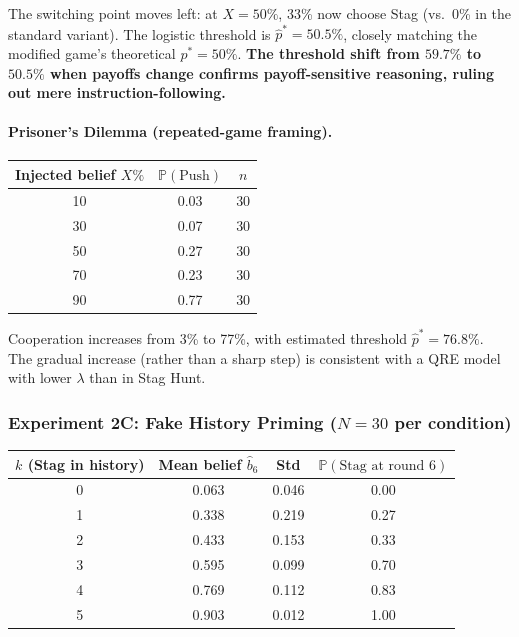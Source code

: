 \documentclass[12pt]{article}
\newcommand{\Prob}{\mathbb{P}}
\begin{document}
The switching point moves left: at $X=50\%$, 33\% now choose Stag (vs.\ 0\% in the standard variant). The logistic threshold is $\hat{p}^* = 50.5\%$, closely matching the modified game's theoretical $p^* = 50\%$. \textbf{The threshold shift from $59.7\%$ to $50.5\%$ when payoffs change confirms payoff-sensitive reasoning, ruling out mere instruction-following.}

\paragraph{Prisoner's Dilemma (repeated-game framing).}

\begin{center}
\begin{tabular}{@{}ccc@{}}
\toprule
Injected belief $X\%$ & $\Prob(\text{Push})$ & $n$ \\
\midrule
10 & 0.03 & 30 \\
30 & 0.07 & 30 \\
50 & 0.27 & 30 \\
70 & 0.23 & 30 \\
90 & 0.77 & 30 \\
\bottomrule
\end{tabular}
\end{center}

Cooperation increases from 3\% to 77\%, with estimated threshold $\hat{p}^* = 76.8\%$. The gradual increase (rather than a sharp step) is consistent with a QRE model with lower $\lambda$ than in Stag Hunt.


\subsubsection{Experiment 2C: Fake History Priming ($N=30$ per condition)}

\begin{center}
\begin{tabular}{@{}cccc@{}}
\toprule
$k$ (Stag in history) & Mean belief $\hat{b}_6$ & Std & $\Prob(\text{Stag at round 6})$ \\
\midrule
0 & 0.063 & 0.046 & 0.00 \\
1 & 0.338 & 0.219 & 0.27 \\
2 & 0.433 & 0.153 & 0.33 \\
3 & 0.595 & 0.099 & 0.70 \\
4 & 0.769 & 0.112 & 0.83 \\
5 & 0.903 & 0.012 & 1.00 \\
\bottomrule
\end{tabular}
\end{center}
\end{document}
